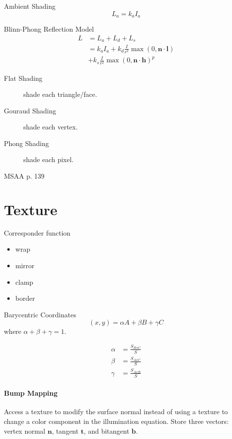 \documentclass[10pt,a4paper]{article}
\begin{document}
\begin{multicols}{3}
		Ambient Shading
		\begin{equation*}
			L_a = k_aI_a
		\end{equation*}

		Blinn-Phong Reflection Model
		\begin{align*}
			L &= L_a + L_d + L_s \\
			&= k_aI_a + k_d\frac{I}{r^2}\max(0,\mathbf{n}\cdot\mathbf{l})\\&+ k_s\frac{I}{r^2}\max(0,\mathbf{n}\cdot\mathbf{h})^p
		\end{align*}

		\begin{description}
			\item[Flat Shading] shade each triangle/face.
			\item[Gouraud Shading] shade each vertex.
			\item[Phong Shading] shade each pixel.  
		\end{description}

		MSAA p. 139

		\section{Texture}
		Corresponder function
		\begin{itemize}
			\item wrap
			\item mirror
			\item clamp
			\item border
		\end{itemize}

		Barycentric Coordinates
		\begin{equation*}
			(x,y) = \alpha A + \beta B + \gamma C
		\end{equation*}
		where $\alpha + \beta + \gamma = 1$.

		\begin{align*}
			\alpha &= \frac{S_{BxC}}{S} \\
			\beta &= \frac{S_{AxC}}{S} \\
			\gamma &= \frac{S_{AxB}}{S}
		\end{align*}

		\paragraph{Bump Mapping} Access a texture to modify the surface normal instead of using a texture to
		change a color component in the illumination equation. Store three vectors: vertex normal $\mathbf{n}$, tangent $\mathbf{t}$, and bitangent $\mathbf{b}$.


\end{multicols}
\end{document}
